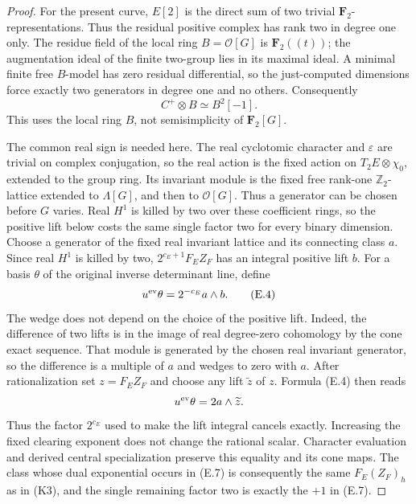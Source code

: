 \documentclass[11pt]{article}
\theoremstyle{definition}
\theoremstyle{remark}
\newcommand{\Z}{\mathbb Z}
\providecommand{\mathscr}[1]{\mathcal{#1}}
\begin{document}
\begin{proof}
For the present curve, $E[2]$ is the direct sum of two trivial
$\mathbf F_2$-representations. Thus the residual positive complex has
rank two in degree one only. The residue field of the local ring
$B=\mathscr O[G]$ is $\mathbf F_2((t))$; the augmentation ideal of
the finite two-group lies in its maximal ideal. A minimal finite free
$B$-model has zero residual differential, so the just-computed dimensions
force exactly two generators in degree one and no others. Consequently
\[
                    C^+\otimes B\simeq B^2[-1].\tag{E.3}
\]
This uses the local ring $B$, not semisimplicity of $\mathbf F_2[G]$.

The common real sign is needed here. The real cyclotomic character
and $\varepsilon$ are trivial on complex conjugation, so the real
action is the fixed action on $T_2E\otimes\chi_0$, extended to the
group ring. Its invariant module is the fixed free rank-one
$\Z_2$-lattice extended to $\Lambda[G]$, and then to
$\mathscr O[G]$. Thus a generator can be chosen before $G$ varies.
Real $H^1$ is killed by two over these coefficient rings, so the
positive lift below costs the same single factor two for every
binary dimension.
Choose a generator of the fixed real invariant lattice and its
connecting class $a$. Since real $H^1$ is killed by two,
$2^{c_E+1}F_EZ_F$ has an integral positive lift $b$.
For a basis $\theta$ of the original inverse determinant line, define
\[
                         u^{\rm ev}\theta=2^{-c_E}a\wedge b.
 \tag{E.4}
\]
The wedge does not depend on the choice of the positive lift.
Indeed, the difference of two lifts is in the image of real
degree-zero cohomology by the cone exact sequence. That module
is generated by the chosen real invariant generator, so the
difference is a multiple of $a$ and wedges to zero with $a$.
After rationalization set $z=F_EZ_F$ and choose any lift
$\widetilde z$ of $z$. Formula (E.4) then reads
\[
              u^{\rm ev}\theta=2a\wedge\widetilde z.
\]
Thus the factor $2^{c_E}$ used to make the lift integral cancels
exactly. Increasing the fixed clearing exponent does not change
the rational scalar. Character evaluation and derived central
specialization preserve this equality and its cone maps. The
class whose dual exponential occurs in (E.7) is consequently
the same $F_E(Z_F)_h$ as in (K3), and the single remaining factor
two is exactly the $+1$ in (E.7).


\end{proof}
\end{document}
